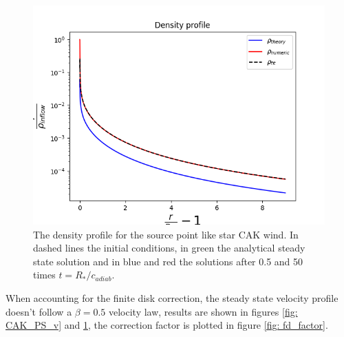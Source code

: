 \begin{figure}
\centering
\includegraphics[width = \textwidth]{CAK_density_profile.png}
\caption{The density profile for the source point like star CAK wind. In dashed lines the initial conditions, in green the analytical steady state solution and in blue and red the solutions after 0.5 and 50 times $t = R_*/c_{adiab}$.}
\label{fig: CAK_PS_rho}
\end{figure}



When accounting for the finite disk correction, the steady state velocity profile doesn't follow a $\beta = 0.5$ velocity law, results are shown in figures \ref{fig: CAK_PS_v} and \ref{fig: CAK_PS_rho}, the correction factor is plotted in figure \ref{fig: fd_factor}. 

